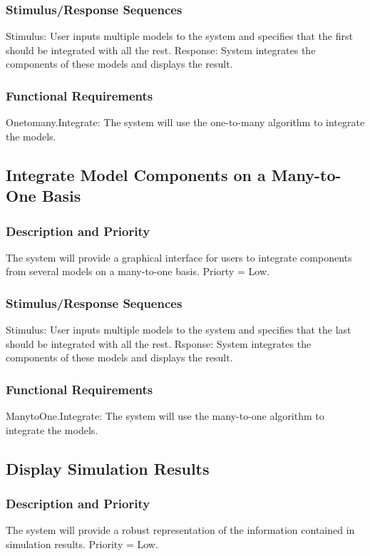 \documentclass{article}
\begin{document}
\subsubsection{Stimulus/Response Sequences}

Stimulus: User inputs multiple models to the system and specifies that the first should be integrated with all the rest.
Response: System integrates the components of these models and displays the result.

\subsubsection{Functional Requirements}

Onetomany.Integrate: The system will use the one-to-many algorithm to integrate the models.

\subsection{Integrate Model Components on a Many-to-One Basis}
\subsubsection{Description and Priority}
The system will provide a graphical interface for users to integrate components from several models on a many-to-one basis.  Priorty = Low.

\subsubsection{Stimulus/Response Sequences}

Stimulus: User inputs multiple models to the system and specifies that the last should be integrated with all the rest.
Rsponse: System integrates the components of these models and displays the result.

\subsubsection{Functional Requirements}

ManytoOne.Integrate: The system will use the many-to-one algorithm to integrate the models.

\subsection{Display Simulation Results}

\subsubsection{Description and Priority}
The system will provide a robust representation of the information contained in simulation results.  Priority = Low.
\end{document}
